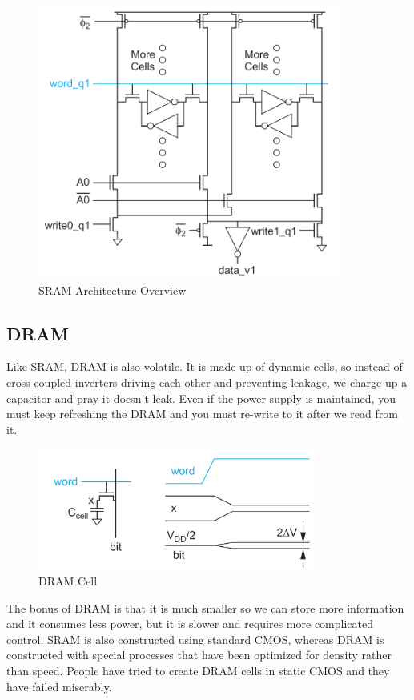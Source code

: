 \documentclass{article}
\begin{document}
 \begin{figure}[ht!]
\centering
\includegraphics[width=100mm]{SRAMOver.png}
\caption{SRAM Architecture Overview}
\label{SRAMOver}
\end{figure}


\subsection{DRAM}

Like SRAM, DRAM is also volatile. It is made up of dynamic cells, so instead of cross-coupled inverters driving each other and preventing leakage, we charge up a capacitor and pray it doesn't leak. Even if the power supply is maintained, you must keep refreshing the DRAM and you must re-write to it after we read from it. 


\begin{figure}[ht!]
\centering
\includegraphics[height=40mm]{DRAM.png}
\caption{DRAM Cell}
\end{figure}


The bonus of DRAM is that it is much smaller so we can store more information and it consumes less power, but it is slower and requires more complicated control. SRAM is also constructed using standard CMOS, whereas DRAM is constructed with special processes that have been optimized for density rather than speed. People have tried to create DRAM cells in static CMOS and they have failed miserably. 
\end{document}
